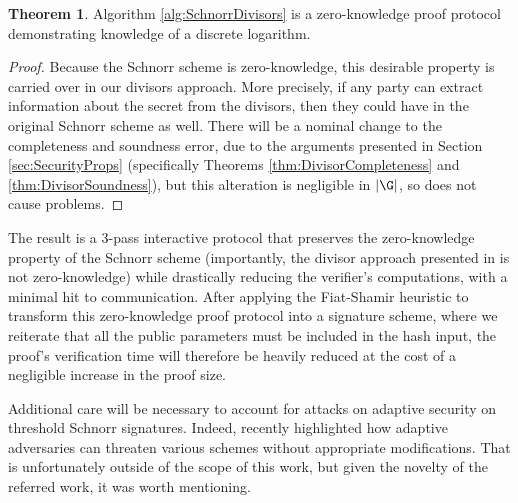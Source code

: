 \documentclass[11pt,letterpaper]{article}
\theoremstyle{definition}
\newtheorem{theorem}{Theorem}[subsection]
\newcommand{\6}{\mathbf}
\newcommand{\7}{\mathcal}
\begin{document}
\begin{theorem}
    Algorithm \ref{alg:SchnorrDivisors} is a zero-knowledge proof protocol demonstrating knowledge of a discrete logarithm.
\end{theorem}
\begin{proof}
    Because the Schnorr scheme is zero-knowledge, this desirable property is carried over in our divisors approach. 
    More precisely, if any party can extract information about the secret from the divisors, then they could have in the original Schnorr scheme as well.
    There will be a nominal change to the completeness and soundness error, due to the arguments presented in Section \ref{sec:SecurityProps} (specifically Theorems \ref{thm:DivisorCompleteness} and \ref{thm:DivisorSoundness}), but this alteration is negligible in $|\G|$, so does not cause problems.
\end{proof}

The result is a $3$-pass interactive protocol that preserves the zero-knowledge property of the Schnorr scheme (importantly, the divisor approach presented in \cite{SoundnessForDLP} is not zero-knowledge) while drastically reducing the verifier's computations, with a minimal hit to communication.
After applying the Fiat-Shamir heuristic to transform this zero-knowledge proof protocol into a signature scheme, where we reiterate that all the public parameters must be included in the hash input, the proof's verification time will therefore be heavily reduced at the cost of a negligible increase in the proof size.

Additional care will be necessary to account for attacks on adaptive security on threshold Schnorr signatures. Indeed, \cite{PlausibleAttack} recently highlighted how adaptive adversaries can threaten various schemes without appropriate modifications. That is unfortunately outside of the scope of this work, but given the novelty of the referred work, it was worth mentioning.
\end{document}
